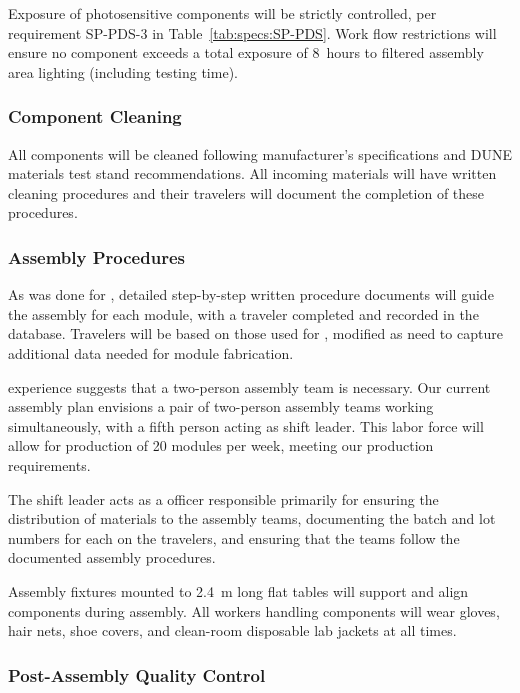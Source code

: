 Exposure of photosensitive components will be strictly controlled, per requirement SP-PDS-3 in Table~\ref{tab:specs:SP-PDS}.  
Work flow restrictions will %
ensure no component exceeds a total exposure of \SI{8}{hours} to filtered assembly area lighting (including testing time).

\subsubsection{Component Cleaning}
\label{sssec:cleaning}
All components will be cleaned 
following manufacturer's specifications and DUNE materials test stand recommendations.  
All incoming materials will have written cleaning procedures and their travelers will document the completion of these procedures.


\subsubsection{Assembly Procedures}

As was done for , detailed step-by-step written procedure documents will 
guide the assembly for each  module, with a  traveler 
completed and recorded in the database.  Travelers will be based on those used for , modified as need to capture additional data needed for  module fabrication.

 experience suggests that a two-person assembly team is necessary.
Our current assembly plan envisions a pair of two-person assembly teams working simultaneously, with a fifth person acting as shift leader.  This labor force will allow for production of \num{20}  modules per week, meeting our production requirements.  

The shift leader acts as a  officer responsible primarily for ensuring the distribution of materials to the assembly teams, documenting the batch and lot numbers for each  on the travelers, and ensuring that the teams follow the documented assembly procedures.

Assembly fixtures mounted to \SI{2.4}{m} long flat tables will %
support and align  components during assembly.  All workers handling  components will wear gloves, hair nets, shoe covers, and clean-room disposable lab jackets at all times.

\subsubsection{Post-Assembly Quality Control}

